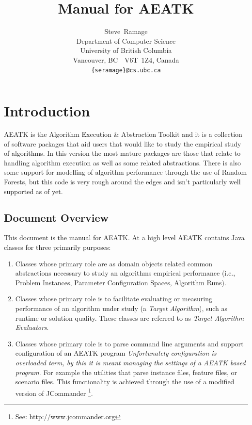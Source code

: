 \documentclass[11pt,letterpaper,oneside]{article}
\begin{document}
\title{Manual for AEATK }
\author{
Steve~Ramage\\
Department of Computer Science\\
University of British Columbia\\
Vancouver, BC\ \ V6T~1Z4, Canada\\
\texttt{\{seramage\}@cs.ubc.ca}
}


\maketitle

\tableofcontents

\section{Introduction}

AEATK is the Algorithm Execution \& Abstraction Toolkit and it is a collection of software packages that aid users that would like to study the empirical study of algorithms. In this version the most mature packages are those that relate to handling algorithm execution as well as some related abstractions. There is also some support for modelling of algorithm performance through the use of Random Forests, but this code is very rough around the edges and isn't particularly well supported as of yet.

\subsection{Document Overview}

This document is the manual for AEATK. At a high level AEATK contains Java classes for three primarily purposes:

\begin{enumerate}
\item Classes whose primary role are as domain objects related common abstractions necessary to study an algorithms empirical performance (i.e., Problem Instances, Parameter Configuration Spaces, Algorithm Runs).

\item Classes whose primary role is to facilitate evaluating or measuring performance of an algorithm under study (a \textit{Target Algorithm}), such as runtime or solution quality. These classes are referred to as \textit{Target Algorithm Evaluators}. 

\item Classes whose primary role is to parse command line arguments and support configuration of an AEATK program \textit{Unfortunately configuration is overloaded term, by this it is meant managing the settings of a AEATK based program}. For example the utilities that parse instance files, feature files, or scenario files. This functionality is achieved through the use of a modified version of JCommander \footnote{See: http://www.jcommander.org}. 

\end{enumerate}
\end{document}
